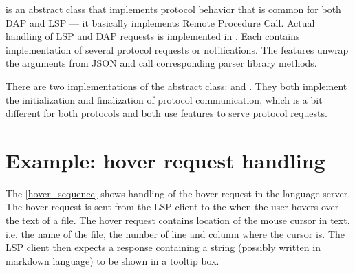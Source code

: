  is an abstract class that implements protocol behavior that is common for both DAP and LSP --- it basically implements Remote Procedure Call. Actual handling of LSP and DAP requests is implemented in . Each  contains implementation of several protocol requests or notifications. The features unwrap the arguments from JSON and call corresponding parser library methods.

There are two implementations of the abstract  class:  and . They both implement the initialization and finalization of protocol communication, which is a bit different for both protocols and both use features to serve protocol requests.

\section{Example: hover request handling}


The \cref{hover_sequence} shows handling of the hover request in the language server. The hover request is sent from the LSP client to the  when the user hovers over the text of a file. The hover request contains location of the mouse cursor in text, i.e. the name of the file, the number of line and column where the cursor is. The LSP client then expects a response containing a string (possibly written in markdown language) to be shown in a tooltip box.

